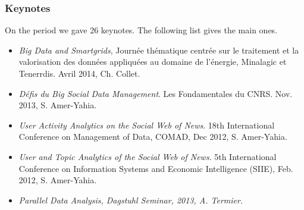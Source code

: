 \subsubsection*{Keynotes}

On the period we gave 26 keynotes. The following list gives the main ones. 

\begin{itemize}

\item \emph{ Big Data and Smartgrids}, Journ{\'e}e th{\'e}matique centr{\'e}e sur le traitement et la valorisation des donn{\'e}es appliqu{\'e}es au domaine de l'{\'e}nergie, Minalagic et Tenerrdis. Avril 2014, Ch. Collet.

\item \emph{D\'efis du Big Social Data Management}. Les Fondamentales du CNRS. Nov. 2013, S. Amer-Yahia.

\item \emph{User Activity Analytics on the Social Web of News}. 18th International Conference on Management of Data, COMAD, Dec 2012, S. Amer-Yahia.


\item \emph{User and Topic Analytics of the Social Web of News}. 5th International Conference on Information Systems and Economic
  Intelligence (SIIE), Feb. 2012, S. Amer-Yahia.
  

\item \em{Parallel Data Analysis}, Dagstuhl Seminar, 2013, A. Termier.





\end{itemize}
